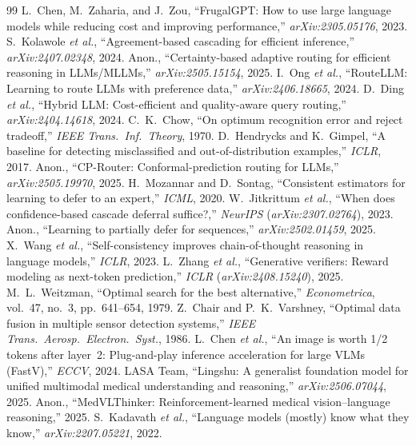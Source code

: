 \documentclass[conference]{IEEEtran}
\begin{document}
\begin{thebibliography}{99}
\footnotesize
{} L.~Chen, M.~Zaharia, and J.~Zou, ``FrugalGPT: How to use large language models while reducing cost and improving performance,'' \emph{arXiv:2305.05176}, 2023.
 S.~Kolawole \emph{et al.}, ``Agreement-based cascading for efficient inference,'' \emph{arXiv:2407.02348}, 2024.
 Anon., ``Certainty-based adaptive routing for efficient reasoning in LLMs/MLLMs,'' \emph{arXiv:2505.15154}, 2025.
 I.~Ong \emph{et al.}, ``RouteLLM: Learning to route LLMs with preference data,'' \emph{arXiv:2406.18665}, 2024.
 D.~Ding \emph{et al.}, ``Hybrid LLM: Cost-efficient and quality-aware query routing,'' \emph{arXiv:2404.14618}, 2024.
 C.~K.~Chow, ``On optimum recognition error and reject tradeoff,'' \emph{IEEE Trans.\ Inf.\ Theory}, 1970.
 D.~Hendrycks and K.~Gimpel, ``A baseline for detecting misclassified and out-of-distribution examples,'' \emph{ICLR}, 2017.
 Anon., ``CP-Router: Conformal-prediction routing for LLMs,'' \emph{arXiv:2505.19970}, 2025.
 H.~Mozannar and D.~Sontag, ``Consistent estimators for learning to defer to an expert,'' \emph{ICML}, 2020.
 W.~Jitkrittum \emph{et al.}, ``When does confidence-based cascade deferral suffice?,'' \emph{NeurIPS} (\emph{arXiv:2307.02764}), 2023.
 Anon., ``Learning to partially defer for sequences,'' \emph{arXiv:2502.01459}, 2025.
 X.~Wang \emph{et al.}, ``Self-consistency improves chain-of-thought reasoning in language models,'' \emph{ICLR}, 2023.
 L.~Zhang \emph{et al.}, ``Generative verifiers: Reward modeling as next-token prediction,'' \emph{ICLR} (\emph{arXiv:2408.15240}), 2025.
 M.~L.~Weitzman, ``Optimal search for the best alternative,'' \emph{Econometrica}, vol.~47, no.~3, pp.~641--654, 1979.
 Z.~Chair and P.~K.~Varshney, ``Optimal data fusion in multiple sensor detection systems,'' \emph{IEEE Trans.\ Aerosp.\ Electron.\ Syst.}, 1986.
 L.~Chen \emph{et al.}, ``An image is worth 1/2 tokens after layer~2: Plug-and-play inference acceleration for large VLMs (FastV),'' \emph{ECCV}, 2024.
 LASA Team, ``Lingshu: A generalist foundation model for unified multimodal medical understanding and reasoning,'' \emph{arXiv:2506.07044}, 2025.
 Anon., ``MedVLThinker: Reinforcement-learned medical vision--language reasoning,'' 2025.
 S.~Kadavath \emph{et al.}, ``Language models (mostly) know what they know,'' \emph{arXiv:2207.05221}, 2022.
\end{thebibliography}
\end{document}
